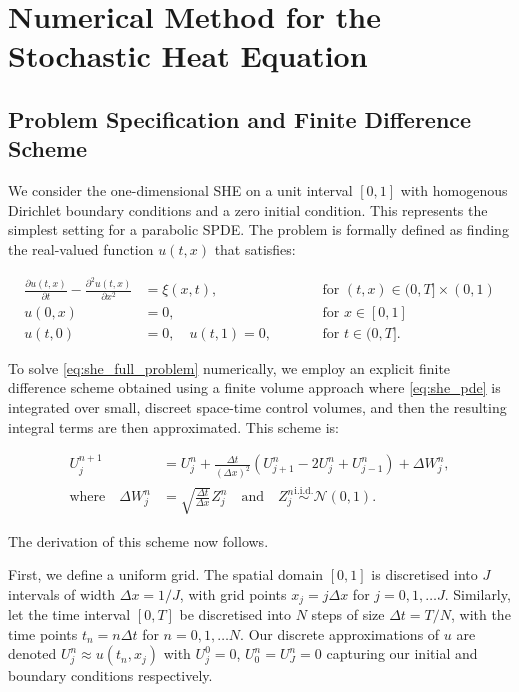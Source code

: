 \section{Numerical Method for the Stochastic Heat Equation}
\subsection{Problem Specification and Finite Difference Scheme}

We consider the one-dimensional SHE on a unit interval $[0,1]$ with
homogenous Dirichlet boundary conditions and a zero initial condition.
This represents the simplest setting for a parabolic SPDE. 
The problem is formally defined as finding the real-valued 
function $u(t,x)$ that satisfies:

\begin{subequations} \label{eq:she_full_problem}
\begin{align}
    \frac{\partial u(t,x)}{\partial t} - \frac{\partial^2 u(t,x)}{\partial x^2} &= \xi(x,t),
    \qquad &&\text{for } (t,x) \in (0, T] \times (0,1) \label{eq:she_pde} \\
    u(0,x) &= 0, \qquad &&\text{for } x \in [0,1] \label{eq:she_ic} \\
    u(t,0) &= 0, \quad u(t,1) = 0, \qquad &&\text{for } t \in (0, T]. \label{eq:she_bc}
\end{align}
\end{subequations}

To solve \eqref{eq:she_full_problem} numerically, we employ
an explicit finite difference scheme
obtained using a finite volume approach \cite{suli2025nspdes} where \eqref{eq:she_pde}
is integrated over small, discreet space-time control volumes, 
and then the resulting integral terms are then approximated.
This scheme is:

\begin{align}
    U_j^{n+1} &= U_j^n + \frac{\Delta t}{(\Delta x)^2} 
    (U_{j+1}^n - 2U_j^n + U_{j-1}^n) + \Delta W_j^n, \label{eq:she_scheme} \\
    \text{where} \quad \Delta W_j^n &= \sqrt{\frac{\Delta t}{\Delta x}} 
    Z_j^n \quad \text{and} \quad Z_j^n \overset{\mathrm{i.i.d.}}{\sim} \mathcal{N}(0,1). \nonumber
\end{align}

The derivation of this scheme now follows.

First, we define a uniform grid. The spatial domain 
$[0,1]$ is discretised into $J$ intervals of width 
$\Delta x = 1 / J$, with grid points $x_j = j \Delta x$ for 
$j = 0, 1, \dots J$. Similarly, let the time interval 
$[0, T]$ be discretised into $N$ steps of size $\Delta t 
= T / N$, with the time points $t_n = n \Delta t$ for 
$n = 0, 1, \dots N$. 
Our discrete approximations of $u$ are denoted $U_j^n \approx 
u(t_n, x_j)$ with $U_j^0 = 0$, $U_0^n = U_J^n = 0$ 
capturing our initial and boundary conditions respectively.

